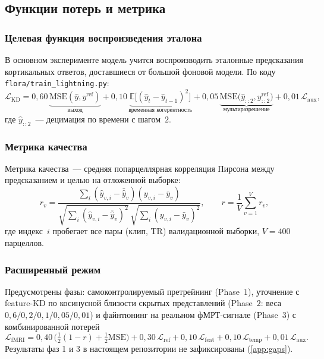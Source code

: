\documentclass[11pt,a4paper]{article}
\begin{document}
\subsection{Функции потерь и метрика}
\label{sec:losses}

\subsubsection{Целевая функция воспроизведения эталона}
\label{sec:loss-kd}

В основном эксперименте модель учится воспроизводить эталонные
предсказания кортикальных ответов, доставшиеся от большой
фоновой модели. По коду \texttt{flora/train\_lightning.py}:
\begin{equation}
\mathcal{L}_{\mathrm{KD}} =
0{,}60\,\underbrace{\mathrm{MSE}(\hat{y}, y^{\mathrm{ref}})}_{\text{выход}}
+ 0{,}10\,\underbrace{\mathbb{E}\big[(\hat{y}_{t} - \hat{y}_{t-1})^2\big]}_{\text{временная когерентность}}
+ 0{,}05\,\underbrace{\mathrm{MSE}\big(\hat{y}_{::2}, y^{\mathrm{ref}}_{::2}\big)}_{\text{мультиразрешение}}
+ 0{,}01\,\mathcal{L}_{\mathrm{aux}},
\label{eq:kdtotal}
\end{equation}
где $\hat{y}_{::2}$~--- децимация по времени с шагом~$2$.

\subsubsection{Метрика качества}

Метрика качества~--- средняя попарцеллярная корреляция Пирсона
между предсказанием и целью на отложенной выборке:
\begin{equation}
r_v = \frac{\sum_i (\hat{y}_{v,i} - \bar{\hat{y}}_v)
(y_{v,i} - \bar{y}_v)}
{\sqrt{\sum_i (\hat{y}_{v,i} - \bar{\hat{y}}_v)^2}\,
 \sqrt{\sum_i (y_{v,i} - \bar{y}_v)^2}}, \qquad
r = \frac{1}{V} \sum_{v=1}^{V} r_v,
\label{eq:pearson}
\end{equation}
где индекс~$i$ пробегает все пары (клип, TR) валидационной выборки,
$V = 400$ парцеллов.

\subsubsection{Расширенный режим}

Предусмотрены фазы: самоконтролируемый претрейнинг (Phase~$1$),
уточнение с feature-KD по косинусной близости скрытых представлений
(Phase~$2$: веса $0{,}6/0{,}2/0{,}1/0{,}05/0{,}01$) и файнтюнинг на
реальном фМРТ-сигнале (Phase~$3$) с комбинированной потерей
\begin{equation}
\mathcal{L}_{\mathrm{fMRI}} = 0{,}40\,\big(\tfrac{1}{2}(1 - r)
+ \tfrac{1}{2}\mathrm{MSE}\big) + 0{,}30\,\mathcal{L}_{\mathrm{ref}}
+ 0{,}10\,\mathcal{L}_{\mathrm{feat}} + 0{,}10\,\mathcal{L}_{\mathrm{temp}}
+ 0{,}01\,\mathcal{L}_{\mathrm{aux}}.
\label{eq:fmriloss}
\end{equation}
Результаты фаз 1 и 3 в настоящем репозитории не зафиксированы
(\cref{app:gaps}).
\end{document}

